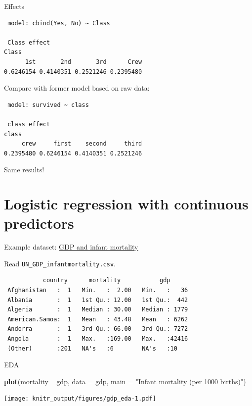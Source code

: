 \documentclass[10pt,ignorenonframetext,]{beamer}
\newenvironment{Shaded}{\begin{snugshade}}{\end{snugshade}}
\newcommand{\KeywordTok}[1]{\textcolor[rgb]{0.13,0.29,0.53}{\textbf{{#1}}}}
\newcommand{\DataTypeTok}[1]{\textcolor[rgb]{0.13,0.29,0.53}{{#1}}}
\newcommand{\StringTok}[1]{\textcolor[rgb]{0.31,0.60,0.02}{{#1}}}
\newcommand{\NormalTok}[1]{{#1}}
\begin{document}
\begin{frame}[fragile]{Effects}

\begin{verbatim}
 model: cbind(Yes, No) ~ Class

 Class effect
Class
      1st       2nd       3rd      Crew 
0.6246154 0.4140351 0.2521246 0.2395480 
\end{verbatim}

Compare with former model based on raw data:

\begin{verbatim}
 model: survived ~ class

 class effect
class
     crew     first    second     third 
0.2395480 0.6246154 0.4140351 0.2521246 
\end{verbatim}

Same results!

\end{frame}

\section{Logistic regression with continuous
predictors}\label{logistic-regression-with-continuous-predictors}

\begin{frame}[fragile]

Example dataset:
\href{http://vincentarelbundock.github.io/Rdatasets/doc/car/UN.html}{GDP
and infant mortality}

Read \texttt{UN\_GDP\_infantmortality.csv}.

\begin{verbatim}
           country      mortality           gdp       
 Afghanistan   :  1   Min.   :  2.00   Min.   :   36  
 Albania       :  1   1st Qu.: 12.00   1st Qu.:  442  
 Algeria       :  1   Median : 30.00   Median : 1779  
 American.Samoa:  1   Mean   : 43.48   Mean   : 6262  
 Andorra       :  1   3rd Qu.: 66.00   3rd Qu.: 7272  
 Angola        :  1   Max.   :169.00   Max.   :42416  
 (Other)       :201   NA's   :6        NA's   :10     
\end{verbatim}

\end{frame}

\begin{frame}[fragile]{EDA}

\begin{Shaded}
\begin{Highlighting}[]
\KeywordTok{plot}\NormalTok{(mortality ~}\StringTok{ }\NormalTok{gdp, }\DataTypeTok{data =} \NormalTok{gdp, }\DataTypeTok{main =} \StringTok{"Infant mortality (per 1000 births)"}\NormalTok{)}
\end{Highlighting}
\end{Shaded}

\texttt{[image: knitr\_output/figures/gdp\_eda-1.pdf]}

\end{frame}
\end{document}
